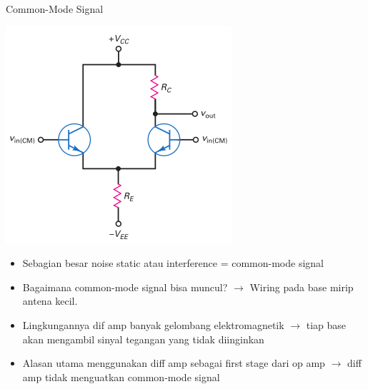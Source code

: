 \documentclass[aspectratio=169]{beamer}
\begin{document}
\begin{frame}{Common-Mode Signal}
	\begin{multicols}{2}
		\begin{center}
			\includegraphics[height=0.7\textheight]{gambar/01.common-mode_input_signal}
		\end{center}
		\columnbreak
		\begin{itemize}
			\item Sebagian besar noise static atau interference = common-mode signal
			\item Bagaimana common-mode signal bisa muncul? $ \rightarrow $ Wiring pada base mirip antena kecil.
			\item Lingkungannya dif amp banyak gelombang elektromagnetik $ \rightarrow $ tiap base akan mengambil sinyal tegangan yang tidak diinginkan
			\item Alasan utama menggunakan diff amp sebagai first stage dari op amp $ \rightarrow $ diff amp tidak menguatkan common-mode signal
		\end{itemize}
	\end{multicols}
\end{frame}
\end{document}
